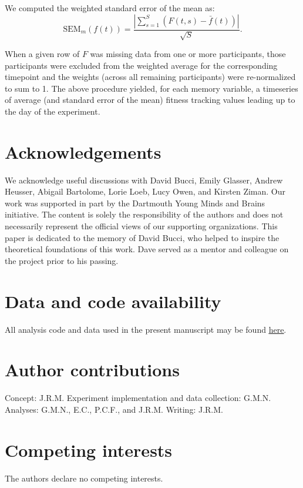 \documentclass[10pt]{article}
\begin{document}
We computed the weighted standard error of the mean as:
\[
\mathrm{SEM}_m\left(f(t)\right) = \frac{\left| \sum_{s=1}^S \left( F(t, s) -
    \bar{f}(t)\right) \right|}{\sqrt{S}}.
\]

When a given row of $F$ was missing data from one or more
participants, those participants were excluded from the weighted
average for the corresponding timepoint and the weights (across all
remaining participants) were re-normalized to sum to 1.  The above
procedure yielded, for each memory variable, a timeseries of average
(and standard error of the mean) fitness tracking values leading up to
the day of the experiment.


\section*{Acknowledgements}
We acknowledge useful discussions with David Bucci, Emily Glasser,
Andrew Heusser, Abigail Bartolome, Lorie Loeb, Lucy Owen, and Kirsten
Ziman.  Our work was supported in part by the Dartmouth Young Minds
and Brains initiative.  The content is solely the responsibility of
the authors and does not necessarily represent the official views of
our supporting organizations.  This paper is dedicated to the memory
of David Bucci, who helped to inspire the theoretical foundations of
this work.  Dave served as a mentor and colleague on the project prior
to his passing.


\section*{Data and code availability}
All analysis code and data used in the present manuscript may be found
\href{https://github.com/ContextLab/brainfit-paper}{\underline{here}}.

\section*{Author contributions}
Concept: J.R.M.  Experiment implementation and data collection: G.M.N.
Analyses: G.M.N., E.C., P.C.F., and J.R.M.  Writing: J.R.M.

\section*{Competing interests}
The authors declare no competing interests.



\end{document}
